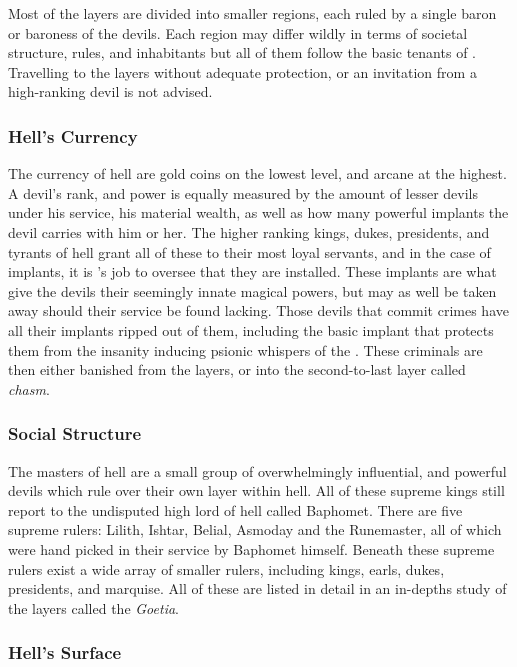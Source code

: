 Most of the layers are divided into smaller regions, each ruled by a single
baron or baroness of the devils. Each region may differ wildly in terms of
societal structure, rules, and inhabitants but all of them follow the basic
tenants of . Travelling to the layers without adequate
protection, or an invitation from a high-ranking devil is not advised.

\subsubsection{Hell's Currency}

The currency of hell are gold coins on the lowest level, and arcane
 at the highest. A devil's rank, and power is equally
measured by the amount of lesser devils under his service, his material
wealth, as well as how many powerful implants the devil carries with him
or her. The higher ranking kings, dukes, presidents, and tyrants of hell
grant all of these to their most loyal servants, and in the case of implants,
it is 's job to oversee that they are installed. These
implants are what give the devils their seemingly innate magical powers,
but may as well be taken away should their service be found lacking. Those
devils that commit crimes have all their implants ripped out of them,
including the basic implant that protects them from the insanity inducing
psionic whispers of the . These criminals are then either
banished from the layers, or into the second-to-last layer called
\emph{chasm}.

\subsubsection{Social Structure}

The masters of hell are a small group of overwhelmingly influential, and
powerful devils which rule over their own layer within hell. All of these
supreme kings still report to the undisputed high lord of hell called
Baphomet. There are five supreme rulers: Lilith, Ishtar, Belial, Asmoday and
the Runemaster, all of which were hand picked in their service by Baphomet
himself. Beneath these supreme rulers exist a wide array of smaller rulers,
including kings, earls, dukes, presidents, and marquise. All of these are
listed in detail in an in-depths study of the layers called the
\emph{Goetia}.

\subsubsection{Hell's Surface}
\label{sec:Hells Surface}

